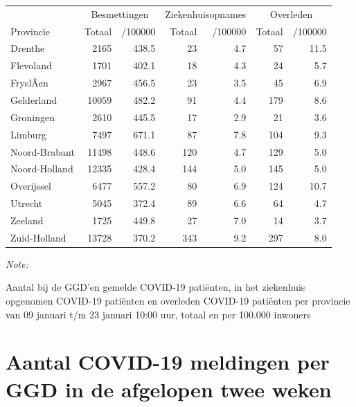 \documentclass[
  english,
  man,floatsintext]{apa6}
\begin{document}
\begin{table}[H]
\centering
\begin{threeparttable}
\begin{tabular}{lrrrrrr}
\toprule
\multicolumn{1}{c}{ } & \multicolumn{2}{c}{Besmettingen} & \multicolumn{2}{c}{Ziekenhuisopnames} & \multicolumn{2}{c}{Overleden} \\
\cmidrule(l{3pt}r{3pt}){2-3} \cmidrule(l{3pt}r{3pt}){4-5} \cmidrule(l{3pt}r{3pt}){6-7}
Provincie & Totaal & /100000 & Totaal & /100000 & Totaal & /100000\\
\midrule
Drenthe & 2165 & 438.5 & 23 & 4.7 & 57 & 11.5\\
Flevoland & 1701 & 402.1 & 18 & 4.3 & 24 & 5.7\\
FryslÃ¢n & 2967 & 456.5 & 23 & 3.5 & 45 & 6.9\\
Gelderland & 10059 & 482.2 & 91 & 4.4 & 179 & 8.6\\
Groningen & 2610 & 445.5 & 17 & 2.9 & 21 & 3.6\\
Limburg & 7497 & 671.1 & 87 & 7.8 & 104 & 9.3\\
Noord-Brabant & 11498 & 448.6 & 120 & 4.7 & 129 & 5.0\\
Noord-Holland & 12335 & 428.4 & 144 & 5.0 & 145 & 5.0\\
Overijssel & 6477 & 557.2 & 80 & 6.9 & 124 & 10.7\\
Utrecht & 5045 & 372.4 & 89 & 6.6 & 64 & 4.7\\
Zeeland & 1725 & 449.8 & 27 & 7.0 & 14 & 3.7\\
Zuid-Holland & 13728 & 370.2 & 343 & 9.2 & 297 & 8.0\\
\bottomrule
\end{tabular}
\begin{tablenotes}
\item \textit{Note: } 
\item Aantal bij de GGD’en gemelde COVID-19 patiënten, in het ziekenhuis opgenomen COVID-19 patiënten en overleden COVID-19 patiënten per provincie van 09 januari t/m 23 januari 10:00 uur, totaal en per 100.000 inwoners
\end{tablenotes}
\end{threeparttable}
\end{table}

\newpage

\hypertarget{aantal-covid-19-meldingen-per-ggd-in-de-afgelopen-twee-weken}{%
\section{Aantal COVID-19 meldingen per GGD in de afgelopen twee weken}\label{aantal-covid-19-meldingen-per-ggd-in-de-afgelopen-twee-weken}}
\end{document}
